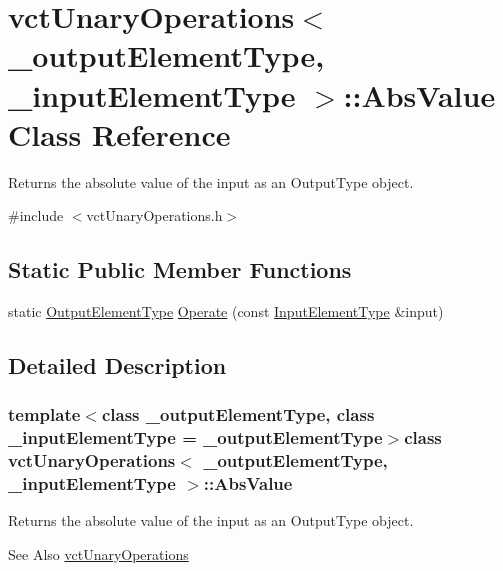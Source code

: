 \hypertarget{classvct_unary_operations_1_1_abs_value}{\section{vct\-Unary\-Operations$<$ \-\_\-output\-Element\-Type, \-\_\-input\-Element\-Type $>$\-:\-:Abs\-Value Class Reference}
\label{classvct_unary_operations_1_1_abs_value}
}


Returns the absolute value of the input as an Output\-Type object.  




{\ttfamily \#include $<$vct\-Unary\-Operations.\-h$>$}

\subsection*{Static Public Member Functions}
\begin{DoxyCompactItemize}
\item 
static \hyperlink{classvct_unary_operations_a42306ac3dd20d32c6d6c66ac3fa2e7b9}{Output\-Element\-Type} \hyperlink{classvct_unary_operations_1_1_abs_value_a69b9a718c651443ecc2bf18079d4481f}{Operate} (const \hyperlink{classvct_unary_operations_abf3b77bb7b8abd7ba72a6a45a65696a7}{Input\-Element\-Type} \&input)
\end{DoxyCompactItemize}


\subsection{Detailed Description}
\subsubsection*{template$<$class \-\_\-output\-Element\-Type, class \-\_\-input\-Element\-Type = \-\_\-output\-Element\-Type$>$class vct\-Unary\-Operations$<$ \-\_\-output\-Element\-Type, \-\_\-input\-Element\-Type $>$\-::\-Abs\-Value}

Returns the absolute value of the input as an Output\-Type object. 

\begin{DoxySeeAlso}{See Also}
\hyperlink{classvct_unary_operations}{vct\-Unary\-Operations} 
\end{DoxySeeAlso}



